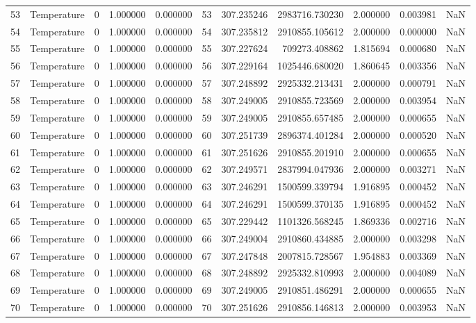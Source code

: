 \begin{tabular}{llrrrrrrrrr}
53 & Temperature & 0 & 1.000000 & 0.000000 & 53 & 307.235246 & 2983716.730230 & 2.000000 & 0.003981 & NaN \\
54 & Temperature & 0 & 1.000000 & 0.000000 & 54 & 307.235812 & 2910855.105612 & 2.000000 & 0.000000 & NaN \\
55 & Temperature & 0 & 1.000000 & 0.000000 & 55 & 307.227624 & 709273.408862 & 1.815694 & 0.000680 & NaN \\
56 & Temperature & 0 & 1.000000 & 0.000000 & 56 & 307.229164 & 1025446.680020 & 1.860645 & 0.003356 & NaN \\
57 & Temperature & 0 & 1.000000 & 0.000000 & 57 & 307.248892 & 2925332.213431 & 2.000000 & 0.000791 & NaN \\
58 & Temperature & 0 & 1.000000 & 0.000000 & 58 & 307.249005 & 2910855.723569 & 2.000000 & 0.003954 & NaN \\
59 & Temperature & 0 & 1.000000 & 0.000000 & 59 & 307.249005 & 2910855.657485 & 2.000000 & 0.000655 & NaN \\
60 & Temperature & 0 & 1.000000 & 0.000000 & 60 & 307.251739 & 2896374.401284 & 2.000000 & 0.000520 & NaN \\
61 & Temperature & 0 & 1.000000 & 0.000000 & 61 & 307.251626 & 2910855.201910 & 2.000000 & 0.000655 & NaN \\
62 & Temperature & 0 & 1.000000 & 0.000000 & 62 & 307.249571 & 2837994.047936 & 2.000000 & 0.003271 & NaN \\
63 & Temperature & 0 & 1.000000 & 0.000000 & 63 & 307.246291 & 1500599.339794 & 1.916895 & 0.000452 & NaN \\
64 & Temperature & 0 & 1.000000 & 0.000000 & 64 & 307.246291 & 1500599.370135 & 1.916895 & 0.000452 & NaN \\
65 & Temperature & 0 & 1.000000 & 0.000000 & 65 & 307.229442 & 1101326.568245 & 1.869336 & 0.002716 & NaN \\
66 & Temperature & 0 & 1.000000 & 0.000000 & 66 & 307.249004 & 2910860.434885 & 2.000000 & 0.003298 & NaN \\
67 & Temperature & 0 & 1.000000 & 0.000000 & 67 & 307.247848 & 2007815.728567 & 1.954883 & 0.003369 & NaN \\
68 & Temperature & 0 & 1.000000 & 0.000000 & 68 & 307.248892 & 2925332.810993 & 2.000000 & 0.004089 & NaN \\
69 & Temperature & 0 & 1.000000 & 0.000000 & 69 & 307.249005 & 2910851.486291 & 2.000000 & 0.000655 & NaN \\
70 & Temperature & 0 & 1.000000 & 0.000000 & 70 & 307.251626 & 2910856.146813 & 2.000000 & 0.003953 & NaN \\

\end{tabular}
